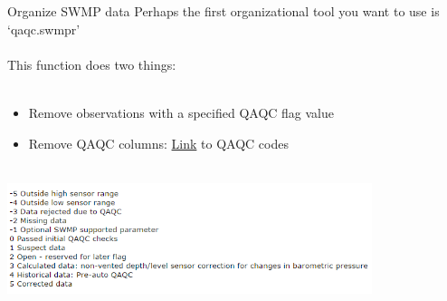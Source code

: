 \documentclass[xcolor=svgnames]{beamer}\usepackage[]{graphicx}\usepackage[]{color}
\begin{document}
\begin{frame}[containsverbatim]{Organize SWMP data}
Perhaps the first organizational tool you want to use is `qaqc.swmpr'\\~\\
This function does two things:\\~\\
\begin{itemize}
\item Remove observations with a specified QAQC flag value
\item Remove QAQC columns: \href{http://cdmo.baruch.sc.edu/data/qaqc.cfm}{Link} to QAQC codes \\~\\
\end{itemize}
\centerline{\includegraphics[width = 0.8\textwidth]{qaqc_flags.png}}
\end{frame}
\end{document}
